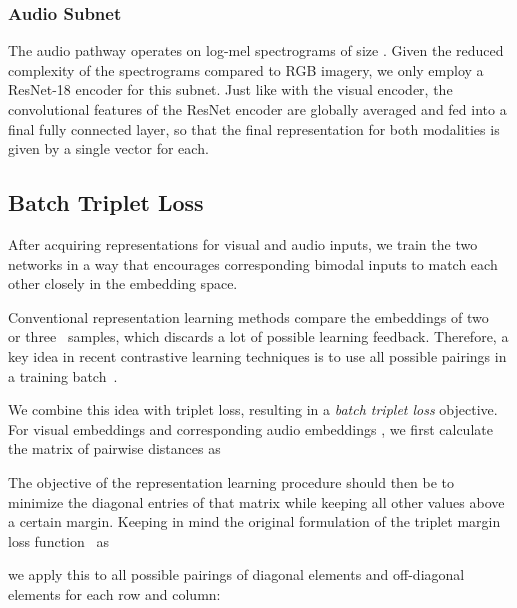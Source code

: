 \documentclass[journal]{IEEEtran}
\begin{document}
\subsubsection{Audio Subnet}
The audio pathway operates on log-mel spectrograms of size .
Given the reduced complexity of the spectrograms compared to RGB imagery,
we only employ a ResNet-18 encoder for this subnet.
Just like with the visual encoder,
the convolutional features of the ResNet encoder are
globally averaged and fed into a final fully connected layer,
so that the final representation for both modalities is
given by a single vector for each.

\subsection{Batch Triplet Loss}
After acquiring representations for visual and audio inputs,
we train the two networks in a way that encourages corresponding
bimodal inputs to match each other closely in the embedding space.

Conventional representation learning methods
compare the embeddings of two~\cite{hadsell_dimensionality_2006}
or three~\cite{weinberger_distance_2009,schroff_facenet_2015} samples,
which discards a lot of possible learning feedback.
Therefore, a key idea in recent contrastive learning techniques
is to use all possible pairings in a training batch~\cite{simclr}.

We combine this idea with triplet loss,
resulting in a \emph{batch triplet loss} objective.
For visual embeddings  and corresponding audio embeddings ,
we first calculate the matrix of pairwise distances  as

The objective of the representation learning procedure should then
be to minimize the diagonal entries of that matrix
while keeping all other values above a certain margin.
Keeping in mind the original formulation of the triplet margin loss function~\cite{weinberger_distance_2009}
as

we apply this to all possible pairings of diagonal elements and off-diagonal elements for each
row and column:
\end{document}
